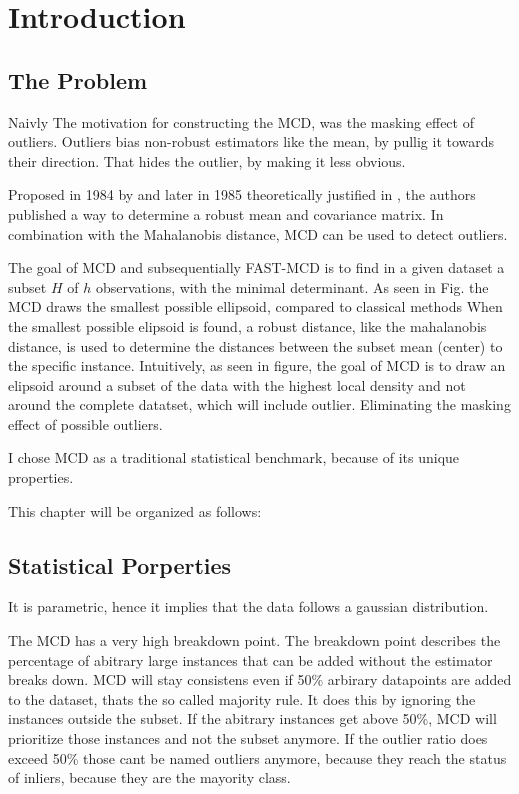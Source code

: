 \section*{Introduction}
\subsection*{The Problem}
Naivly 
The motivation for constructing the MCD, was the masking effect of outliers.
Outliers bias non-robust estimators like the mean, by pullig it towards their direction.
That hides the outlier, by making it less obvious.

Proposed in 1984 by \citet{rousseeuw1984least} and later in 1985 theoretically justified in \citet{rousseeuw1985multivariate}, the authors published a way to determine a robust mean and covariance matrix.
In combination with the Mahalanobis distance, MCD can be used to detect outliers.


The goal of MCD and subsequentially FAST-MCD is to find in a given dataset a subset $H$ of $h$  observations, with the minimal determinant.
As seen in Fig. the MCD draws the smallest possible ellipsoid, compared to classical methods 
When the smallest possible elipsoid is found, a robust distance, like the mahalanobis distance, is used to determine the distances between the subset mean (center) to the specific instance.
Intuitively,  as seen in figure, the goal of MCD is to draw an elipsoid around a subset of the data with the highest local density and not around the complete datatset, which will include outlier. 
Eliminating the masking effect of possible outliers. 


I chose MCD as a traditional statistical benchmark, because of its unique properties.


This chapter will be organized as follows:


\subsection*{Statistical Porperties}
It is parametric, hence it implies that the data follows a gaussian distribution.

The MCD has a very high breakdown point.
The breakdown point describes the percentage of abitrary large instances that can be added without the estimator breaks down.
MCD will stay consistens even if 50\% arbirary datapoints are added to the dataset, thats the so called majority rule.
It does this by ignoring the instances outside the subset.
If the abitrary instances get above 50\%, MCD will prioritize those instances and not the subset anymore.
If the outlier ratio does exceed 50\% those cant be named outliers anymore, because they reach the status of inliers, because they are the mayority class. 

